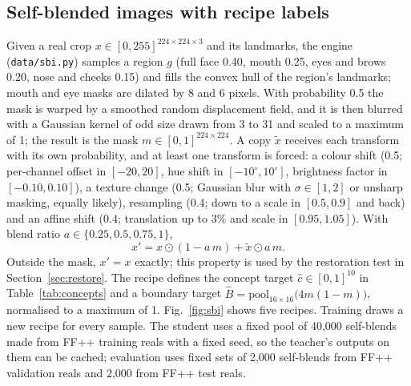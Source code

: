 \documentclass[conference]{IEEEtran}
\begin{document}
\subsection{Self-blended images with recipe labels}\label{sec:sbi}
Given a real crop $x\in[0,255]^{224\times224\times3}$ and its landmarks, the engine (\texttt{data/sbi.py}) samples a
region $g$ (full face 0.40, mouth 0.25, eyes and brows 0.20, nose and cheeks 0.15) and fills the convex hull of the
region's landmarks; mouth and eye masks are dilated by 8 and 6 pixels. With probability 0.5 the mask is warped by a
smoothed random displacement field, and it is then blurred with a Gaussian kernel of odd size drawn from 3 to 31 and
scaled to a maximum of 1; the result is the mask $m\in[0,1]^{224\times224}$. A copy $\tilde x$ receives each transform with its own
probability, and at least one transform is forced: a colour shift (0.5; per-channel offset in $[-20,20]$, hue shift
in $[-10^\circ,10^\circ]$, brightness factor in $[-0.10,0.10]$), a texture change (0.5; Gaussian blur with
$\sigma\in[1,2]$ or unsharp masking, equally likely), resampling (0.4; down to a scale in $[0.5,0.9]$ and back) and
an affine shift (0.4; translation up to 3\% and scale in $[0.95,1.05]$). With blend ratio
$a\in\{0.25,0.5,0.75,1\}$,
\begin{equation}
x' = x\odot(1-a\,m) + \tilde x\odot a\,m .
\label{eq:blend}
\end{equation}
Outside the mask, $x'=x$ exactly; this property is used by the restoration test in Section~\ref{sec:restore}.
The recipe defines the concept target $\hat c\in[0,1]^{10}$ in Table~\ref{tab:concepts} and a boundary target
$\hat B = \mathrm{pool}_{16\times16}\bigl(4m(1-m)\bigr)$, normalised to a maximum of 1. Fig.~\ref{fig:sbi} shows five
recipes. Training draws a new recipe for every sample. The student uses a fixed pool of 40,000 self-blends made from
FF++ training reals with a fixed seed, so the teacher's outputs on them can be cached; evaluation uses fixed sets of
2,000 self-blends from FF++ validation reals and 2,000 from FF++ test reals.
\end{document}
